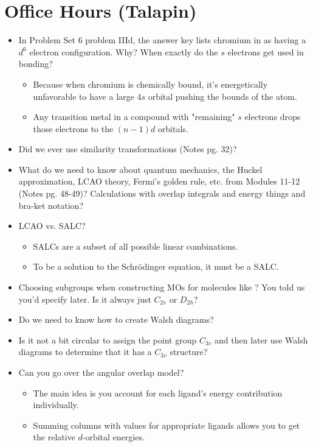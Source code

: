 \documentclass[../notes.tex]{subfiles}
\begin{document}
\section{Office Hours (Talapin)}
\begin{itemize}
    \item {}In Problem Set 6 problem IIId, the answer key lists chromium in  as having a $d^6$ electron configuration. Why? When exactly do the $s$ electrons get used in bonding?
    \begin{itemize}
        \item Because when chromium is chemically bound, it's energetically unfavorable to have a large $4s$ orbital pushing the bounds of the atom.
        \item Any transition metal in a compound with "remaining" $s$ electrons drops those electrons to the $(n-1)d$ orbitals.
    \end{itemize}
    \item Did we ever use similarity transformations (Notes pg. 32)?
    \item What do we need to know about quantum mechanics, the Huckel approximation, LCAO theory, Fermi's golden rule, etc. from Modules 11-12 (Notes pg. 48-49)? Calculations with overlap integrals and energy things and bra-ket notation?
    \item LCAO vs. SALC?
    \begin{itemize}
        \item SALCs are a subset of all possible linear combinations.
        \item To be a solution to the Schr\"{o}dinger equation, it must be a SALC.
    \end{itemize}
    \item Choosing subgroups when constructing MOs for molecules like ? You told us you'd specify later. Is it always just $C_{2v}$ or $D_{2h}$?
    \item Do we need to know how to create Walsh diagrams?
    \item Is it not a bit circular to assign the point group $C_{3v}$ and then later use Walsh diagrams to determine that it has a $C_{3v}$ structure?
    \item Can you go over the angular overlap model?
    \begin{itemize}
        \item The main idea is you account for each ligand's energy contribution individually.
        \item Summing columns with values for appropriate ligands allows you to get the relative $d$-orbital energies.

\end{itemize}
\end{itemize}
\end{document}
